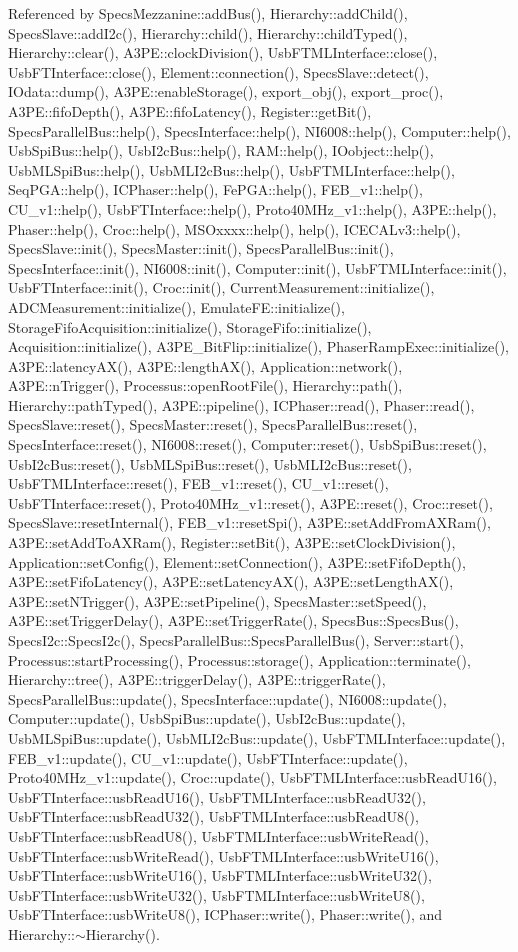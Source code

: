 Referenced by SpecsMezzanine::addBus(), Hierarchy::addChild(), SpecsSlave::addI2c(), Hierarchy::child(), Hierarchy::childTyped(), Hierarchy::clear(), A3PE::clockDivision(), UsbFTMLInterface::close(), UsbFTInterface::close(), Element::connection(), SpecsSlave::detect(), IOdata::dump(), A3PE::enableStorage(), export\_\-obj(), export\_\-proc(), A3PE::fifoDepth(), A3PE::fifoLatency(), Register::getBit(), SpecsParallelBus::help(), SpecsInterface::help(), NI6008::help(), Computer::help(), UsbSpiBus::help(), UsbI2cBus::help(), RAM::help(), IOobject::help(), UsbMLSpiBus::help(), UsbMLI2cBus::help(), UsbFTMLInterface::help(), SeqPGA::help(), ICPhaser::help(), FePGA::help(), FEB\_\-v1::help(), CU\_\-v1::help(), UsbFTInterface::help(), Proto40MHz\_\-v1::help(), A3PE::help(), Phaser::help(), Croc::help(), MSOxxxx::help(), help(), ICECALv3::help(), SpecsSlave::init(), SpecsMaster::init(), SpecsParallelBus::init(), SpecsInterface::init(), NI6008::init(), Computer::init(), UsbFTMLInterface::init(), UsbFTInterface::init(), Croc::init(), CurrentMeasurement::initialize(), ADCMeasurement::initialize(), EmulateFE::initialize(), StorageFifoAcquisition::initialize(), StorageFifo::initialize(), Acquisition::initialize(), A3PE\_\-BitFlip::initialize(), PhaserRampExec::initialize(), A3PE::latencyAX(), A3PE::lengthAX(), Application::network(), A3PE::nTrigger(), Processus::openRootFile(), Hierarchy::path(), Hierarchy::pathTyped(), A3PE::pipeline(), ICPhaser::read(), Phaser::read(), SpecsSlave::reset(), SpecsMaster::reset(), SpecsParallelBus::reset(), SpecsInterface::reset(), NI6008::reset(), Computer::reset(), UsbSpiBus::reset(), UsbI2cBus::reset(), UsbMLSpiBus::reset(), UsbMLI2cBus::reset(), UsbFTMLInterface::reset(), FEB\_\-v1::reset(), CU\_\-v1::reset(), UsbFTInterface::reset(), Proto40MHz\_\-v1::reset(), A3PE::reset(), Croc::reset(), SpecsSlave::resetInternal(), FEB\_\-v1::resetSpi(), A3PE::setAddFromAXRam(), A3PE::setAddToAXRam(), Register::setBit(), A3PE::setClockDivision(), Application::setConfig(), Element::setConnection(), A3PE::setFifoDepth(), A3PE::setFifoLatency(), A3PE::setLatencyAX(), A3PE::setLengthAX(), A3PE::setNTrigger(), A3PE::setPipeline(), SpecsMaster::setSpeed(), A3PE::setTriggerDelay(), A3PE::setTriggerRate(), SpecsBus::SpecsBus(), SpecsI2c::SpecsI2c(), SpecsParallelBus::SpecsParallelBus(), Server::start(), Processus::startProcessing(), Processus::storage(), Application::terminate(), Hierarchy::tree(), A3PE::triggerDelay(), A3PE::triggerRate(), SpecsParallelBus::update(), SpecsInterface::update(), NI6008::update(), Computer::update(), UsbSpiBus::update(), UsbI2cBus::update(), UsbMLSpiBus::update(), UsbMLI2cBus::update(), UsbFTMLInterface::update(), FEB\_\-v1::update(), CU\_\-v1::update(), UsbFTInterface::update(), Proto40MHz\_\-v1::update(), Croc::update(), UsbFTMLInterface::usbReadU16(), UsbFTInterface::usbReadU16(), UsbFTMLInterface::usbReadU32(), UsbFTInterface::usbReadU32(), UsbFTMLInterface::usbReadU8(), UsbFTInterface::usbReadU8(), UsbFTMLInterface::usbWriteRead(), UsbFTInterface::usbWriteRead(), UsbFTMLInterface::usbWriteU16(), UsbFTInterface::usbWriteU16(), UsbFTMLInterface::usbWriteU32(), UsbFTInterface::usbWriteU32(), UsbFTMLInterface::usbWriteU8(), UsbFTInterface::usbWriteU8(), ICPhaser::write(), Phaser::write(), and Hierarchy::$\sim$Hierarchy().


